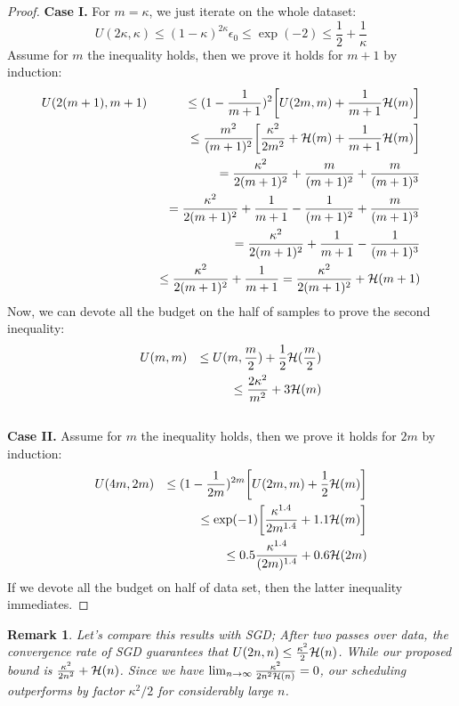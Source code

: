 \documentclass{article}
\newtheorem{remark}[definition]{Remark}
\newcommand{\bound}{{\cal H}}
\begin{document}
\begin{proof}
    \textbf{Case I.} 
	For $m=\kappa$, we just iterate on the whole dataset: 
	\begin{equation*}
		U(2 \kappa, \kappa) \leq  (1-\kappa)^{2 \kappa} \epsilon_0 \leq \exp(-2) \leq
		\frac{1}{2} + \frac{1}{\kappa} 
	\end{equation*}
	Assume for $m$ the inequality holds, then we prove it holds for $m+1$ by
	induction: 
	\begin{eqnarray*}
		& U(2(m+1),m+1) & \leq (1-\frac{1}{m+1})^2 \bigg[ U(2m,m) + \frac{1}{m+1}
		\bound(m) \bigg] \\
		& & \leq \frac{m^2}{(m+1)^2} \bigg[ \frac{\kappa^2}{2 m^2} + \bound(m)
		+ \frac{1}{m+1} \bound(m) \bigg]
		\\
		& & = \frac{\kappa^2}{2 (m+1)^2} + \frac{m}{(m+1)^2} + \frac{m}{(m+1)^3} \\
		& & = \frac{\kappa^2}{2 (m+1)^2} + \frac{1}{m+1}- \frac{1}{(m+1)^2}+
		\frac{m}{(m+1)^3} \\ 
		& & = \frac{\kappa^2}{2 (m+1)^2} + \frac{1}{m+1} -\frac{1}{(m+1)^3} \\
		& & \leq \frac{\kappa^2}{2 (m+1)^2} + \frac{1}{m+1} = \frac{\kappa^2}{2
		(m+1)^2} + \bound(m+1)
	\end{eqnarray*}
	Now, we can devote all the budget on the half of samples to prove the second
	inequality: 
	\begin{eqnarray*}
		& U(m,m) & \leq U(m,\frac{m}{2}) + \frac{1}{2} \bound(\frac{m}{2}) \\ 
		& & \leq \frac{2\kappa^2}{m^2} + 3 \bound(m)
	\end{eqnarray*}
	\\
	\textbf{Case II.} 
	Assume for $m$ the inequality holds, then we prove it holds for $2m$ by
	induction: 
	\begin{eqnarray*}
		& U(4m,2m) & \leq (1-\frac{1}{2m})^{2m} \bigg[ U(2m,m) + \frac{1}{2}
		\bound(m) \bigg] \\
		& & \leq \exp(-1) \bigg[ \frac{\kappa^{1.4}}{2 m^{1.4}} 
		+ 1.1 \bound(m) \bigg]
		\\
		& & \leq  0.5 \frac{\kappa^{1.4}}{(2 m)^{1.4}} + 0.6 \bound(2m)
	\end{eqnarray*}
	If we devote all the budget on half of data set, then the latter
	inequality immediates.
\end{proof}
\begin{remark}
	Let's compare this results with SGD; After two passes over data, the
	convergence rate of SGD guarantees that $U(2n,n) \leq \frac{\kappa^2}{2}  \bound(n)$. While
	our proposed bound is $\frac{\kappa^2}{2n^2} + \bound(n)$. Since we have
	$\lim_{n\rightarrow \infty} \frac{\kappa^2}{2n^2\bound(n)} = 0$, our
	scheduling outperforms by factor $\kappa^2/2$ for considerably large $n$. 
\end{remark}
\end{document}
